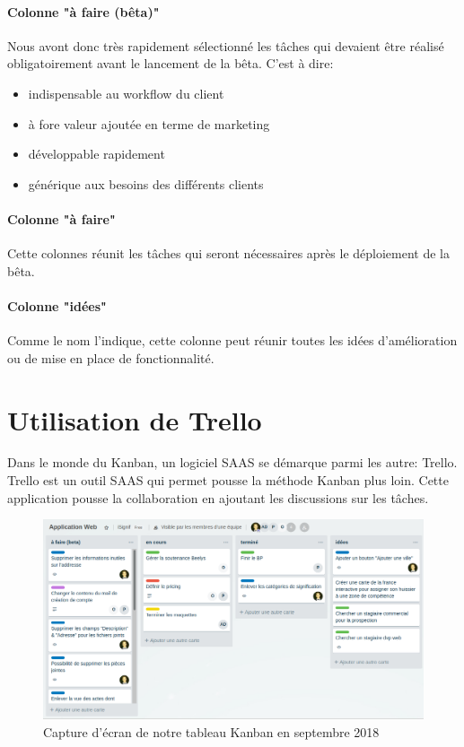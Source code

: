 \documentclass[]{report}
\begin{document}
      \paragraph{Colonne "à faire (bêta)"}

        Nous avont donc très rapidement sélectionné les tâches qui devaient être réalisé obligatoirement avant le lancement de la bêta. C'est à dire:

        \begin{itemize}
          \item indispensable au workflow du client
          \item à fore valeur ajoutée en terme de marketing
          \item développable rapidement
          \item générique aux besoins des différents clients
        \end{itemize}

      \paragraph{Colonne "à faire"}

        Cette colonnes réunit les tâches qui seront nécessaires après le déploiement de la bêta.

      \paragraph{Colonne "idées"}

        Comme le nom l'indique, cette colonne peut réunir toutes les idées d'amélioration ou de mise en place de fonctionnalité.

  \section{Utilisation de Trello}

    Dans le monde du Kanban, un logiciel SAAS se démarque parmi les autre: Trello. Trello est un outil SAAS qui permet pousse la méthode Kanban plus loin. Cette application pousse la collaboration en ajoutant les discussions sur les tâches.

    \begin{figure}[h!]
      \includegraphics[width=\linewidth]{img/trello.png}
      \caption{Capture d'écran de notre tableau Kanban en septembre 2018}
    \end{figure}
\end{document}
